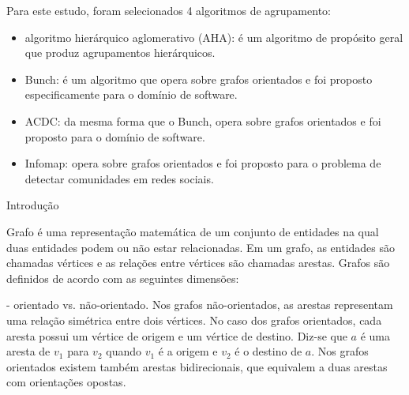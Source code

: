 \begin{itemize}

Para este estudo, foram selecionados 4 algoritmos de agrupamento: 

\begin{itemize}
	\item algoritmo hierárquico aglomerativo (AHA): é um algoritmo de propósito geral que produz agrupamentos hierárquicos.
	\item Bunch: é um algoritmo que opera sobre grafos orientados e foi proposto especificamente para o domínio de software.
	\item ACDC: da mesma forma que o Bunch, opera sobre grafos orientados e foi proposto para o domínio de software.
	\item Infomap: opera sobre grafos orientados e foi proposto para o problema de detectar comunidades em redes sociais.
\end{itemize}






\begin{section}{Introdução}
	
\end{section}


Grafo é uma representação matemática de um conjunto de entidades na qual duas entidades podem ou não estar relacionadas. Em um grafo, as entidades são chamadas vértices e as relações entre vértices são chamadas arestas. Grafos são definidos de acordo com as seguintes dimensões:

- orientado vs. não-orientado. Nos grafos não-orientados, as arestas representam uma relação simétrica entre dois vértices. No caso dos grafos orientados, cada aresta possui um vértice de origem e um vértice de destino. Diz-se que $a$ é uma aresta de $v_1$ para $v_2$ quando $v_1$ é a origem e $v_2$ é o destino de $a$. Nos grafos orientados existem também arestas bidirecionais, que equivalem a duas arestas com orientações opostas.


\end{itemize}
